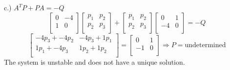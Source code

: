 \documentclass{homeworg}
\newcommand{\transpose}[1]{\ensuremath{#1^{\scriptscriptstyle T}}}
\begin{document}
c.) \(\transpose{A}P+PA=-Q \)
\begin{equation*}
\begin{bmatrix}
  0 & -4\\
  1 & 0\\
\end{bmatrix}
\begin{bmatrix}
  p_1 & p_2\\
  p_2 & p_3\\
\end{bmatrix} +
\begin{bmatrix}
p_1 & p_2\\
p_2 & p_3\\
\end{bmatrix}
\begin{bmatrix}
  0 & 1\\
  -4 & 0\\
\end{bmatrix} = -Q
\end{equation*}
\begin{equation*}
\begin{bmatrix}
  -4 p_3 + -4 p_2 & -4 p_3 + 1 p_1 \\
  1 p_1 + -4 p_3 & 1 p_2 + 1 p_2 \\
\end{bmatrix} =
\begin{bmatrix}
  0 & 1\\
  -1 & 0\\
\end{bmatrix} \Rightarrow
P = \text{undetermined}
\end{equation*}
The system is unstable and does not have a unique solution.\\
\end{document}
